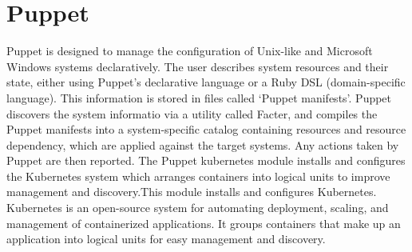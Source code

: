 \section{Puppet}

Puppet \cite{WhatisPuppet} is designed to manage the configuration of Unix-like
and Microsoft Windows systems declaratively. The user describes system resources
and their state, either using Puppet's declarative language or a Ruby DSL
(domain-specific language).  This information is stored in files called
 `Puppet manifests'. Puppet discovers the system informatio via
a utility called  Facter, and compiles the Puppet manifests into a
system-specific catalog containing resources and resource dependency, which are
applied against the target systems. Any actions taken by Puppet are then
reported.  The Puppet  kubernetes module
\cite{KubernetesModule} installs and configures the Kubernetes system which
arranges containers into logical units to improve management and discovery.This
module installs and configures Kubernetes. Kubernetes is an open-source system
for automating deployment, scaling, and management of containerized
applications. It groups containers that make up an application into logical
units for easy management and discovery.
